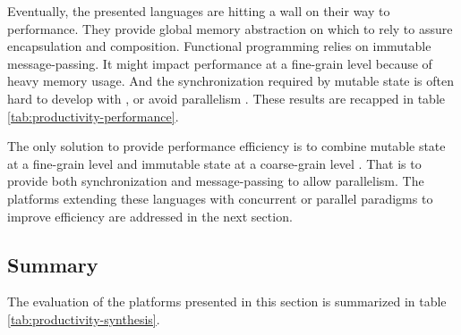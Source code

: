 Eventually, the presented languages are hitting a wall on their way to performance.
They provide global memory abstraction on which to rely to assure encapsulation and composition. %
Functional programming relies on immutable message-passing.
It might impact performance at a fine-grain level because of heavy memory usage.
And the synchronization required by mutable state is often hard to develop with \cite{Adya2002}, or avoid parallelism \cite{Pai1999,Krohn2007}.
These results are recapped in table \ref{tab:productivity-performance}.


The only solution to provide performance efficiency is to combine mutable state at a fine-grain level and immutable state at a coarse-grain level .
That is to provide both synchronization and message-passing to allow parallelism.
The platforms extending these languages with concurrent or parallel paradigms to improve efficiency are addressed in the next section.

\subsection{Summary} \label{chapter3:software-productivity:summary}

The evaluation of the platforms presented in this section is summarized in table \ref{tab:productivity-synthesis}.
















\endinput

Octave and python: higher-level scripting languages productivity and performance evaluation, by Chaves, Nehrbass, Guilfoos, Gardiner.
Haskell vs Ada vs C++ vs Awk vs ... an experiment in software productivity, technical report by Hudak and Jones.
An empirical comparison of seven programming languages, by Prechelt.


remote first Zack Holman : promote asynchronous communication
\ftnt{http://zachholman.com/posts/remote-first/}
+
Conway's law
\cit{Organizations which design systems [...] are constrained to produce designs which are copies of the communication structures of these organizations.}
{M. Conway \cite{Conway1968}}


What makes a great software engineer? \cite{Li2015}

About great software development:
Productivity : Sackman et. al 68, Gugerty & Olson 86
Collaboration, meaningful contribution : Kelly 99, Begel & Simon 06, Hewner & Guzdial 10
Communicate and acquire understanding : LaToza 06, Ko 06
Technical Knowledge : 
Open minded : McConnell 04, Bryant 13


Compiler productivity language into perfomance language
\cite{Kuper2015}\nt{TODO update biblio entry}